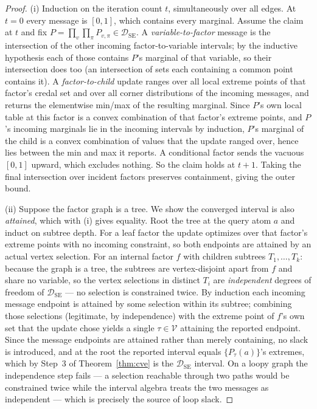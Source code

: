 \documentclass[11pt]{article}
\theoremstyle{definition}
\newcommand{\DSE}{\mathcal{D}_{\mathrm{SE}}}
\begin{document}
\begin{proof}
(i) Induction on the iteration count $t$, simultaneously over all edges. At $t=0$ every message is
$[0,1]$, which contains every marginal. Assume the claim at $t$ and fix $P=\prod_v\prod_\pi P_{v,\pi}
\in\DSE$. A \emph{variable-to-factor} message is the intersection of the other incoming
factor-to-variable intervals; by the inductive hypothesis each of those contains $P$'s marginal of
that variable, so their intersection does too (an intersection of sets each containing a common point
contains it). A \emph{factor-to-child} update ranges over all local extreme points of that factor's
credal set and over all corner distributions of the incoming messages, and returns the elementwise
min/max of the resulting marginal. Since $P$'s own local table at this factor is a convex combination
of that factor's extreme points, and $P$'s incoming marginals lie in the incoming intervals by
induction, $P$'s marginal of the child is a convex combination of values that the update ranged over,
hence lies between the min and max it reports. A conditional factor sends the vacuous $[0,1]$ upward,
which excludes nothing. So the claim holds at $t+1$. Taking the final intersection over incident
factors preserves containment, giving the outer bound.

(ii) Suppose the factor graph is a tree. We show the converged interval is also \emph{attained},
which with (i) gives equality. Root the tree at the query atom $a$ and induct on subtree depth. For a
leaf factor the update optimizes over that factor's extreme points with no incoming constraint, so
both endpoints are attained by an actual vertex selection. For an internal factor $f$ with children
subtrees $T_1,\dots,T_k$: because the graph is a tree, the subtrees are vertex-disjoint apart from $f$
and share no variable, so the vertex selections in distinct $T_i$ are \emph{independent} degrees of
freedom of $\DSE$ --- no selection is constrained twice. By induction each incoming message endpoint
is attained by some selection within its subtree; combining those selections (legitimate, by
independence) with the extreme point of $f$'s own set that the update chose yields a single
$\tau\in\mathcal V$ attaining the reported endpoint. Since the message endpoints are attained rather
than merely containing, no slack is introduced, and at the root the reported interval equals
$\{P_\tau(a)\}$'s extremes, which by Step~3 of Theorem~\ref{thm:cve} is the $\DSE$ interval. On a
loopy graph the independence step fails --- a selection reachable through two paths would be
constrained twice while the interval algebra treats the two messages as independent --- which is
precisely the source of loop slack.
\end{proof}
\end{document}
